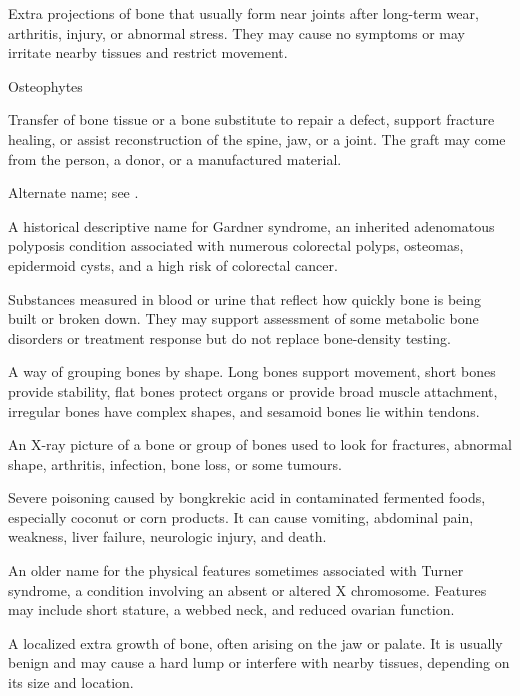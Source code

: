  Extra projections of bone that usually form near joints after long-term wear, arthritis, injury, or abnormal stress. They may cause no symptoms or may irritate nearby tissues and restrict movement.

\synonyms
Osteophytes

 Transfer of bone tissue or a bone substitute to repair a defect, support fracture healing, or assist reconstruction of the spine, jaw, or a joint. The graft may come from the person, a donor, or a manufactured material.

 Alternate name; see .

 A historical descriptive name for Gardner syndrome, an inherited adenomatous polyposis condition associated with numerous colorectal polyps, osteomas, epidermoid cysts, and a high risk of colorectal cancer.

 Substances measured in blood or urine that reflect how quickly bone is being built or broken down. They may support assessment of some metabolic bone disorders or treatment response but do not replace bone-density testing.

 A way of grouping bones by shape. Long bones support movement, short bones provide stability, flat bones protect organs or provide broad muscle attachment, irregular bones have complex shapes, and sesamoid bones lie within tendons.

 An X-ray picture of a bone or group of bones used to look for fractures, abnormal shape, arthritis, infection, bone loss, or some tumours.

 Severe poisoning caused by bongkrekic acid in contaminated fermented foods, especially coconut or corn products. It can cause vomiting, abdominal pain, weakness, liver failure, neurologic injury, and death.

 An older name for the physical features sometimes associated with Turner syndrome, a condition involving an absent or altered X chromosome. Features may include short stature, a webbed neck, and reduced ovarian function.

 A localized extra growth of bone, often arising on
the jaw or palate. It is usually benign and may cause a hard lump or interfere
with nearby tissues, depending on its size and location.

